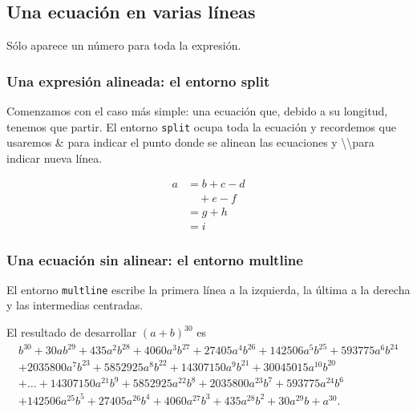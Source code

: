 \documentclass{article}
\numberwithin{equation}{section}
\theoremstyle{plain}
\theoremstyle{definition}
\theoremstyle{remark}
\begin{document}
\subsection{Una ecuación en varias líneas}

Sólo aparece un número para toda la expresión.

\subsubsection{Una expresión alineada: el entorno split}

Comenzamos con el caso más simple: una ecuación que, debido a su longitud, tenemos que partir. El entorno \texttt{split} ocupa toda la ecuación y recordemos que usaremos \& para indicar el punto donde se alinean las ecuaciones y \textbackslash\textbackslash para indicar nueva línea.
\begin{codigo-lado}
\begin{equation} \label{eq:ejemplo-split}
	\begin{split}
		a & = b+c-d\\
		  & \quad {}+e-f\\
          & = g+h\\
          & = i
\end{split}
\end{equation}
\end{codigo-lado}

\subsubsection{Una ecuación sin alinear: el entorno multline}

El entorno \texttt{multline} escribe la primera línea a la izquierda, la última a la derecha y las intermedias centradas.

\begin{codigo-arriba}
El resultado de desarrollar \((a+b)^{30}\) es
\begin{multline*}
b^{30}+30 a b^{29}+435 a^2 b^{28}+4060 a^3 b^{27} + 27405 a^4 b^{26} 
+ 142506 a^5 b^{25} + 593775 a^6 b^{24}\\ 
+ 2035800 a^7 b^{23} + 5852925 a^8 b^{22} + 14307150 a^9 b^{21} + 30045015 a^{10} b^{20} \\
+ \dots +  14307150 a^{21} b^9 + 5852925 a^{22} b^8 
+ 2035800 a^{23} b^7 + 593775 a^{24} b^6 \\
+ 142506 a^{25} b^5 + 27405 a^{26} b^4 + 4060 a^{27} b^{3} + 435 a^{28} b^2 
+30 a^{29} b + a^{30} .
\end{multline*}
\end{codigo-arriba}
\end{document}

